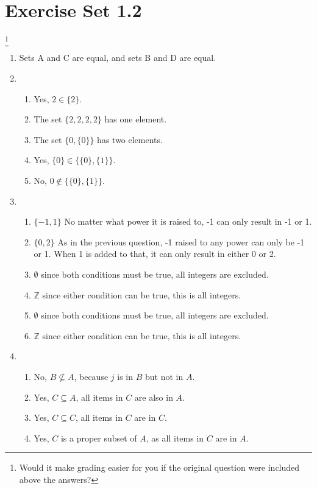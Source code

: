 \documentclass[12pt]{article}
\begin{document}
\section*{Exercise Set 1.2} \footnote{Would it make grading easier for
you if the original question were included above the answers?}
\begin{enumerate}
\item Sets A and C are equal, and sets B and D are equal.
  \setcounter{enumi}{3}
\item %
  \begin{enumerate}
  \item Yes, $2 \in \{2\}$.
  \item The set $\{2,2,2,2\}$ has one element.
  \item The set $\{0,\{0\}\}$ has two elements.
  \item Yes, $\{0\} \in \{\{0\},\{1\}\}$.
  \item No, $0 \not\in \{\{0\},\{1\}\}$.
  \end{enumerate}

  \setcounter{enumi}{6}
\item %
  \begin{enumerate}    
  \item $\{-1,1\}$ No matter what power it is raised to, -1 can only result in -1 or 1.
  \item $\{0,2\}$ As in the previous question, -1 raised to any power can only be -1 or 1. When 1 is added to
    that, it can only result in either 0 or 2.
  \item $ \emptyset $ since both conditions must be true, all integers are excluded.
  \item $ \mathbb{Z} $ since either condition can be true, this is all integers.
  \item $ \emptyset $ since both conditions must be true, all integers are excluded.
  \item $ \mathbb{Z} $ since either condition can be true, this is all integers.
  \end{enumerate}

\setcounter{enumi}{7}
\item %
  \begin{enumerate}
  \item No, $B \not\subseteq A$, because $j$ is in $B$ but not in $A$.
  \item Yes, $C \subseteq A$, all items in $C$ are also in $A$.
  \item Yes, $C \subseteq C$, all items in $C$ are in $C$.
  \item Yes, $C$ is a proper subset of $A$, as all items in $C$ are in $A$.
  \end{enumerate}


\end{enumerate}
\end{document}
